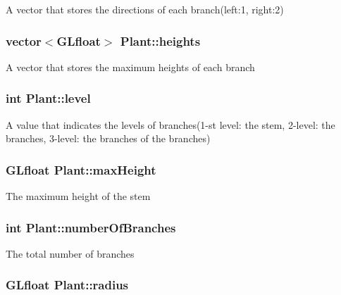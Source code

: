 A vector that stores the directions of each branch(left\+:1, right\+:2) \hypertarget{class_plant_aa12026d894eba8a2764d5edf94757850}{
\subsubsection[{heights}]{\setlength{\rightskip}{0pt plus 5cm}vector$<$G\+Lfloat$>$ Plant\+::heights\hspace{0.3cm}{\ttfamily [protected]}}}\label{class_plant_aa12026d894eba8a2764d5edf94757850}
A vector that stores the maximum heights of each branch \hypertarget{class_plant_ab49e92a2ab4ecdc762b5a1711fa3d65f}{
\subsubsection[{level}]{\setlength{\rightskip}{0pt plus 5cm}int Plant\+::level\hspace{0.3cm}{\ttfamily [protected]}}}\label{class_plant_ab49e92a2ab4ecdc762b5a1711fa3d65f}
A value that indicates the levels of branches(1-\/st level\+: the stem, 2-\/level\+: the branches, 3-\/level\+: the branches of the branches) \hypertarget{class_plant_a71a5a857d8a0adcfb612dadfcfffc731}{
\subsubsection[{max\+Height}]{\setlength{\rightskip}{0pt plus 5cm}G\+Lfloat Plant\+::max\+Height\hspace{0.3cm}{\ttfamily [protected]}}}\label{class_plant_a71a5a857d8a0adcfb612dadfcfffc731}
The maximum height of the stem \hypertarget{class_plant_a4f86c46865d6211636140cef8805c6ee}{
\subsubsection[{number\+Of\+Branches}]{\setlength{\rightskip}{0pt plus 5cm}int Plant\+::number\+Of\+Branches\hspace{0.3cm}{\ttfamily [protected]}}}\label{class_plant_a4f86c46865d6211636140cef8805c6ee}
The total number of branches \hypertarget{class_plant_abef0f751fe6b1b43ed208966a70b4ab3}{
\subsubsection[{radius}]{\setlength{\rightskip}{0pt plus 5cm}G\+Lfloat Plant\+::radius\hspace{0.3cm}{\ttfamily [protected]}}}\label{class_plant_abef0f751fe6b1b43ed208966a70b4ab3}
